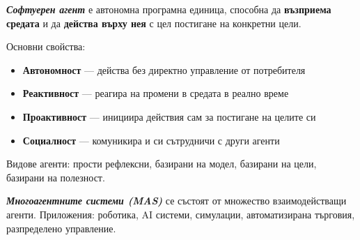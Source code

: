 \documentclass{scrartcl}
\begin{document}
\begin{FlushLeft}
\textbf{\textit{Софтуерен агент}} е автономна програмна единица, способна да \textbf{възприема средата}
и да \textbf{действа върху нея} с цел постигане на конкретни цели.

Основни свойства:
\begin{itemize}
    \item \textbf{Автономност} — действа без директно управление от потребителя
    \item \textbf{Реактивност} — реагира на промени в средата в реално време
    \item \textbf{Проактивност} — инициира действия сам за постигане на целите си
    \item \textbf{Социалност} — комуникира и си сътрудничи с други агенти
\end{itemize}

Видове агенти: прости рефлексни, базирани на модел, базирани на цели, базирани на полезност.

\textbf{\textit{Многоагентните системи (MAS)}} се състоят от множество взаимодействащи агенти.
Приложения: роботика, AI системи, симулации, автоматизирана търговия, разпределено управление.

\end{FlushLeft}
\end{document}
